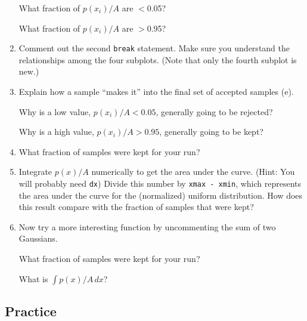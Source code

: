\documentclass[11pt,titlepage,fleqn]{article}
\newcommand{\vertgap}{\vspace{1cm}}
\begin{document}
\begin{enumerate}
What fraction of $p(x_i)/A$ are $<$0.05?

What fraction of $p(x_i)/A$ are $>$0.95?

\vertgap

\item Comment out the second \verb+break+ statement. Make sure you understand the relationships among the four subplots. (Note that only the fourth subplot is new.)

\vertgap

\item Explain how a sample ``makes it'' into the final set of accepted samples (e).

Why is a low value, $p(x_i)/A < 0.05$, generally going to be rejected?

Why is a high value, $p(x_i)/A > 0.95$, generally going to be kept?

\vertgap

\item What fraction of samples were kept for your run?

\vertgap

\item Integrate $p(x)/A$ numerically to get the area under the curve. (Hint: You will probably need \verb+dx+) Divide this number by \verb+xmax - xmin+, which represents the area under the curve for the (normalized) uniform distribution. How does this result compare with the fraction of samples that were kept?

\vertgap

\item Now try a more interesting function by uncommenting the sum of two Gaussians.

What fraction of samples were kept for your run?

What is $\int p(x)/A \, dx$?

\end{enumerate}


\subsection*{Practice}
\end{document}
